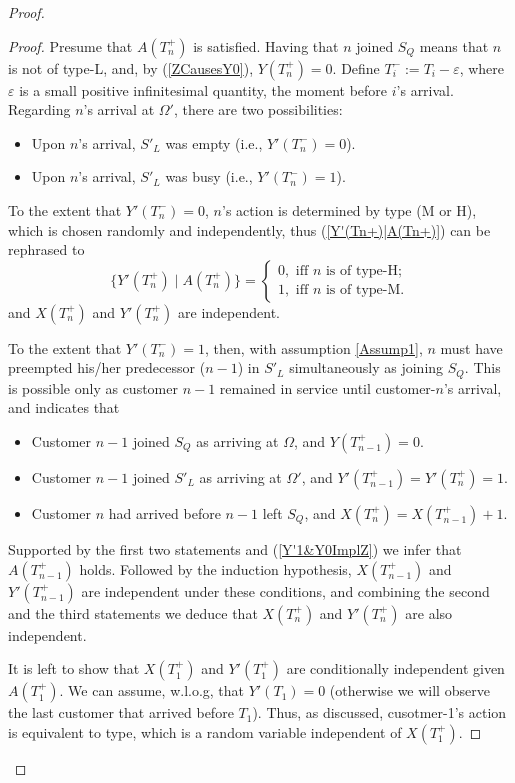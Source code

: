 \documentclass[11pt]{article}
\numberwithin{equation}{section}
\begin{document}
\begin{proof}
\begin{proof}
Presume that $A(T_n^+)$ is satisfied. Having that $n$ joined $S_Q$ means that $n$ is not of type-L, and, by (\ref{ZCausesY0}), $Y(T_n^+)=0$. Define $T_i^- := T_i -\varepsilon$, where $\varepsilon$ is a small positive infinitesimal quantity, the moment before $i$'s arrival. Regarding $n$'s arrival at $\Omega'$, there are two possibilities:
\begin{itemize}
\item Upon $n$'s arrival, $S'_L$ was empty (i.e., $Y'(T_n^-)=0$).
\item Upon $n$'s arrival, $S'_L$ was busy (i.e., $Y'(T_n^-)=1$).
\end{itemize}

To the extent that $Y'(T_n^-)=0$, $n$'s action is determined by type (M or H), which is chosen randomly and independently, thus (\ref{Y'(Tn+)|A(Tn+)}) can be rephrased to
\[
\lbrace Y'(T_n^+) \mid A(T_n^+) \rbrace = \begin{cases} 0, \mbox{ iff $n$ is of type-H}; \\ 1, \mbox{ iff $n$ is of type-M}. \end{cases}
\]
and $X(T_n^+)$ and $Y'(T_n^+)$ are independent.

To the extent that $Y'(T_n^-)=1$, then, with assumption \ref{Assump1}, $n$ must have preempted his/her predecessor ($n-1$) in $S'_L$ simultaneously as joining $S_Q$. This is possible only as customer $n-1$ remained in service until customer-$n$'s arrival, and indicates that
\begin{itemize}
\item Customer $n-1$ joined $S_Q$ as arriving at $\Omega$, and $Y(T_{n-1}^+)=0$.
\item Customer $n-1$ joined $S'_L$ as arriving at $\Omega'$, and $Y'(T_{n-1}^+)=Y'(T_n^+)=1$.
\item Customer $n$ had arrived before $n-1$ left $S_Q$, and $X(T_n^+) = X(T_{n-1}^+) + 1$.
\end{itemize}
Supported by the first two statements and (\ref{Y'1&Y0ImplZ}) we infer that $A(T_{n-1}^+)$ holds. Followed by the induction hypothesis, $X(T_{n-1}^+)$ and $Y'(T_{n-1}^+)$ are independent under these conditions, and combining the second and the third statements we deduce that $X(T_{n}^+)$ and $Y'(T_{n}^+)$ are also independent.

It is left to show that $X(T_1^+)$ and $Y'(T_1^+)$ are conditionally independent given $A(T_1^+)$. We can assume, w.l.o.g, that $Y'(T_1)=0$ (otherwise we will observe the last customer that arrived before $T_1$). Thus, as discussed, cusotmer-1's action is equivalent to type, which is a random variable independent of $X(T_1^+)$.
\end{proof}


\end{proof}
\end{document}
